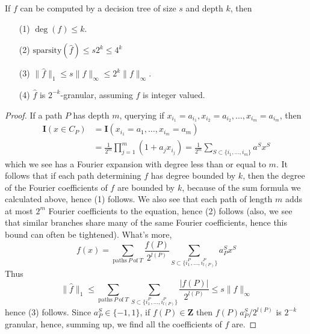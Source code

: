 \begin{theorem}
    If $f$ can be computed by a decision tree of size $s$ and depth $k$, then
    \begin{enumerate}
        \item[(1)] $\deg(f) \leq k$.
        \item[(2)] $\text{sparsity}(\widehat{f}) \leq s2^k \leq 4^k$
        \item[(3)] $\| \widehat{f} \|_1 \leq s \| f \|_\infty \leq 2^k \| f \|_\infty$.
        \item[(4)] $\widehat{f}$ is $2^{-k}$-granular, assuming $f$ is integer valued.
    \end{enumerate}
\end{theorem}
\begin{proof}
    If a path $P$ has depth $m$, querying if $x_{i_1} = a_{i_1}, x_{i_2} = a_{i_2}, \dots, x_{i_m} = a_{i_m}$, then
    \begin{align*}
        \mathbf{I}(x \in C_P) &= \mathbf{I}(x_{i_1} = a_1, \dots, x_{i_m} = a_m)\\
        &= \frac{1}{2^m} \prod_{j = 1}^m \left( 1 + a_j x_{i_j} \right) = \frac{1}{2^m} \sum_{S \subset \{ i_1, \dots, i_m \}} a^Sx^S
    \end{align*}
    which we see has a Fourier expansion with degree less than or equal to $m$. It follows that if each path determining $f$ has degree bounded by $k$, then the degree of the Fourier coefficients of $f$ are bounded by $k$, because of the sum formula we calculated above, hence (1) follows. We also see that each path of length $m$ adds at most $2^m$ Fourier coefficients to the equation, hence (2) follows (also, we see that similar branches share many of the same Fourier coefficients, hence this bound can often be tightened). What's more,
    \[ f(x) = \sum_{\text{paths}\ P\ \text{of}\ T} \frac{f(P)}{2^{l(P)}} \sum_{S \subset \{ i^P_1, \dots, i^P_{l(P)} \} } a_P^Sx^S \]
    Thus
    \[ \| \widehat{f} \|_1 \leq \sum_{\text{paths}\ P\ \text{of}\ T} \sum_{S \subset \{ i^P_1, \dots, i^P_{l(P)} \}} \frac{|f(P)|}{2^{l(P)}} \leq s \| f \|_\infty \]
    hence (3) follows. Since $a_P^S \in \{ -1, 1 \}$, if $f(P) \in \mathbf{Z}$ then $f(P) a_P^S / 2^{l(P)}$ is $2^{-k}$ granular, hence, summing up, we find all the coefficients of $f$ are.
\end{proof}


